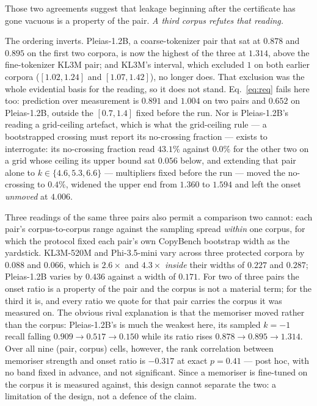 Those two agreements suggest that leakage beginning after the certificate has gone vacuous is a
property of the pair. \emph{A third corpus refutes that reading.}

The ordering inverts. Pleias-1.2B, a coarse-tokenizer pair that sat at $0.878$ and $0.895$ on the
first two corpora, is now the highest of the three at $1.314$, above the fine-tokenizer KL3M pair;
and KL3M's interval, which excluded $1$ on both earlier corpora ($[1.02, 1.24]$ and $[1.07, 1.42]$),
no longer does. That exclusion was the whole evidential basis for the reading, so it does not
stand. Eq.~\eqref{eq:req} fails here too: prediction over measurement is $0.891$ and
$1.004$ on two pairs and $0.652$ on Pleias-1.2B, outside the $[0.7, 1.4]$ fixed before the run. Nor
is Pleias-1.2B's reading a grid-ceiling artefact, which is what the grid-ceiling rule --- a bootstrapped
crossing must report its no-crossing fraction --- exists to interrogate: its no-crossing fraction read $43.1\%$ against $0.0\%$ for the other two on a
grid whose ceiling its upper bound sat $0.056$ below, and extending that pair alone to
$k \in \{4.6, 5.3, 6.6\}$ --- multipliers fixed before the run --- moved the no-crossing to $0.4\%$,
widened the upper end from $1.360$ to $1.594$ and left the onset \emph{unmoved} at $4.006$.

Three readings of the same three pairs also permit a comparison two cannot: each pair's
corpus-to-corpus range against the sampling spread \emph{within} one corpus, for which the protocol
fixed each pair's own CopyBench bootstrap width as the yardstick. KL3M-520M and Phi-3.5-mini vary
across three protected corpora by $0.088$ and $0.066$, which is $2.6\times$ and $4.3\times$
\emph{inside} their widths of $0.227$ and $0.287$; Pleias-1.2B varies by $0.436$ against a width of
$0.171$. For two of three pairs the onset ratio is a property of the pair and the corpus is not a
material term; for the third it is, and every ratio we quote for that pair carries the corpus it was
measured on. The obvious rival explanation is that the memoriser moved rather than the corpus:
Pleias-1.2B's is much the weakest here, its sampled $k=-1$ recall falling
$0.909 \to 0.517 \to 0.150$ while its ratio rises $0.878 \to 0.895 \to 1.314$. Over all nine
(pair, corpus) cells, however, the rank correlation between memoriser strength and onset ratio is
$-0.317$ at exact $p = 0.41$ --- post hoc, with no band fixed in advance, and not significant. Since
a memoriser is fine-tuned on the corpus it is measured against, this design cannot separate the two:
a limitation of the design, not a defence of the claim.

